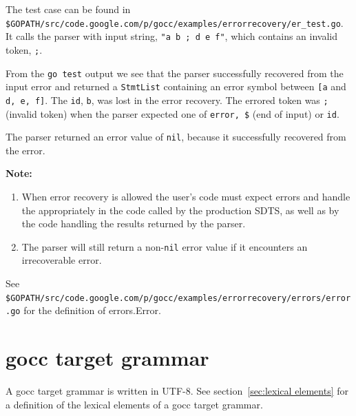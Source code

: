 \documentclass[12pt]{article}
\begin{document}
	The test case can be found in \\
	\verb|$GOPATH/src/code.google.com/p/gocc/examples/errorrecovery/er_test.go|. \\
	It calls the parser with input string, \verb|"a b ; d e f"|, which contains an invalid token, \verb|;|.

	From the \verb|go test| output we see that the parser successfully recovered from the input error and returned a \verb|StmtList| containing an error symbol between \verb|[a| and \verb|d, e, f]|. The \verb|id|, \verb|b|, was lost in the error recovery.  The errored token was \verb|;| (invalid token) when the parser expected one of \verb|error, $| (end of input) or \verb|id|.

	The parser returned an error value of \verb|nil|, because it successfully recovered from the error.

	{\bf Note:} \\
	\begin{enumerate}
		\item When error recovery is allowed the user's code must expect errors and handle the appropriately in the code called by the production SDTS, as well as by the code handling the results returned by the parser.

		\item The parser will still return a non-\verb|nil| error value if it encounters an irrecoverable error.
	\end{enumerate}

	See \verb|$GOPATH/src/code.google.com/p/gocc/examples/errorrecovery/errors/error.go| for the definition of errors.Error.

\appendix
\section{gocc target grammar}\label{sec:gocc bnf}
	A gocc target grammar is written in UTF-8. See section~\ref{sec:lexical elements} for a definition of the lexical elements of a gocc target grammar. 
\end{document}
